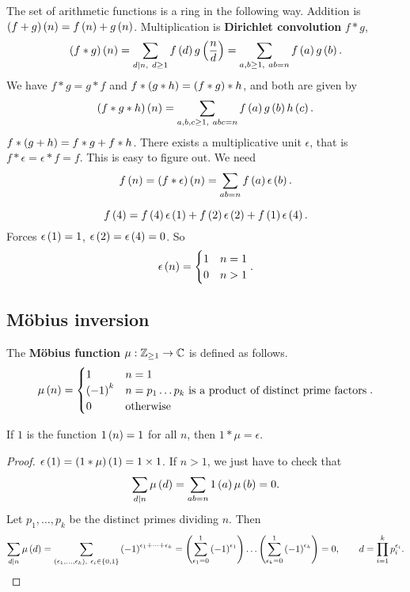 The set of arithmetic functions is a ring in the following way. Addition is $ \left( f + g \right)\left( n \right) = f\left( n \right) + g\left( n \right) $. Multiplication is \textbf{Dirichlet convolution} $ f * g $,
$$ \left( f * g \right)\left( n \right) = \sum_{d \mid n, \ d \ge 1} f\left( d \right)g\left( \dfrac{n}{d} \right) = \sum_{a, b \ge 1, \ ab = n} f\left( a \right)g\left( b \right). $$
We have $ f * g = g * f $ and $ f * \left( g * h \right) = \left( f * g \right) * h $, and both are given by
$$ \left( f * g * h \right)\left( n \right) = \sum_{a, b, c \ge 1, \ abc = n} f\left( a \right)g\left( b \right)h\left( c \right). $$
$ f * \left( g + h \right) = f * g + f * h $. There exists a multiplicative unit $ \epsilon $, that is $ f * \epsilon = \epsilon * f = f $. This is easy to figure out. We need
$$ f\left( n \right) = \left( f * \epsilon \right)\left( n \right) = \sum_{ab = n} f\left( a \right)\epsilon\left( b \right). $$

\begin{example2}
$$ f\left( 4 \right) = f\left( 4 \right)\epsilon\left( 1 \right) + f\left( 2 \right)\epsilon\left( 2 \right) + f\left( 1 \right)\epsilon\left( 4 \right). $$
Forces $ \epsilon\left( 1 \right) = 1 $, $ \epsilon\left( 2 \right) = \epsilon\left( 4 \right) = 0 $. So
$$ \epsilon\left( n \right) =
\begin{cases}
1 & n = 1 \\
0 & n > 1
\end{cases}.
$$
\end{example2}

\subsection{M\"obius inversion}

The \textbf{M\"obius function} $ \mu : \mathbb{Z}_{\ge 1} \to \mathbb{C} $ is defined as follows.
$$ \mu\left( n \right) =
\begin{cases}
1 & n = 1 \\
\left( -1 \right)^k & n = p_1 \dots p_k \ \text{is a product of distinct prime factors} \\
0 & \text{otherwise}
\end{cases}.
$$

\begin{lemma}
\label{lem:103}
If $ 1 $ is the function $ 1\left( n \right) = 1 $ for all $ n $, then $ 1 * \mu = \epsilon $.
\end{lemma}

\begin{proof}
$ \epsilon\left( 1 \right) = \left( 1 * \mu \right)\left( 1 \right) = 1 \times 1 $. If $ n > 1 $, we just have to check that
$$ \sum_{d \mid n} \mu\left( d \right) = \sum_{ab = n} 1\left( a \right)\mu\left( b \right) = 0. $$
Let $ p_1, \dots, p_k $ be the distinct primes dividing $ n $. Then
$$ \sum_{d \mid n} \mu\left( d \right) = \sum_{\left( \epsilon_1, \dots, \epsilon_k \right), \ \epsilon_i \in \left\{ 0, 1 \right\}} \left( -1 \right)^{\epsilon_1 + \dots + \epsilon_k} = \left( \sum_{\epsilon_1 = 0}^1 \left( -1 \right)^{\epsilon_1} \right) \dots \left( \sum_{\epsilon_k = 0}^1 \left( -1 \right)^{\epsilon_k} \right) = 0, \qquad d = \prod_{i = 1}^k p_i^{\epsilon_i}. $$
\end{proof}

